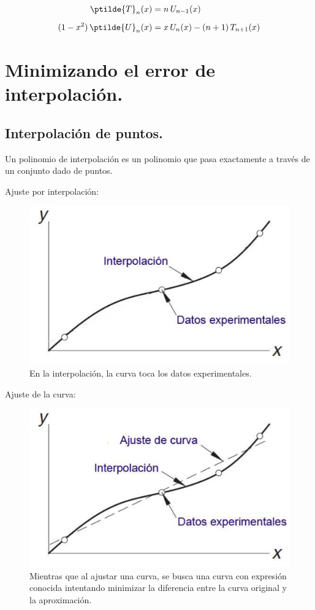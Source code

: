 \begin{align*}
\ptilde{T}_{n} (x) &= n \, U_{n-1} (x) \\[0.5em]
(1 - x^{2}) \, \ptilde{U}_{n} (x) &= x \, U_{n} (x) - (n + 1) \, T_{n+1} (x)
\end{align*}

\section{Minimizando el error de interpolación.}

\subsection{Interpolación de puntos.}

Un polinomio de interpolación es un polinomio que pasa exactamente a través de un conjunto dado de puntos.
\par
Ajuste por interpolación:
\begin{figure}[H]
   \centering
   \includegraphics[scale=0.5]{Imagenes/Interpol02.eps}
   \caption{En la interpolación, la curva toca los datos experimentales.}
\end{figure}

Ajuste de la curva:
\begin{figure}[H]
   \centering
   \includegraphics[scale=0.5]{Imagenes/Interpol03.eps}
   \caption{Mientras que al ajustar una curva, se busca una curva con expresión conocida intentando minimizar la diferencia entre la curva original y la aproximación.}
\end{figure}

